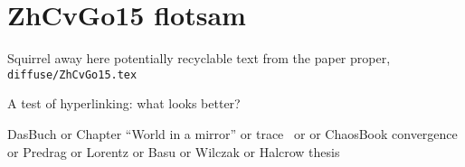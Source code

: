 
\section{ZhCvGo15 flotsam}
\label{s:flotsam}

Squirrel away here potentially recyclable text from the
paper proper, \texttt{diffuse/ZhCvGo15.tex}




A test of hyperlinking: what looks better?

DasBuch
or
 {Chapter ``{World} in a mirror''}
or trace~
or 
or ChaosBook convergence
or Predrag
or Lorentz
or Basu
or Wilczak
or Halcrow thesis
